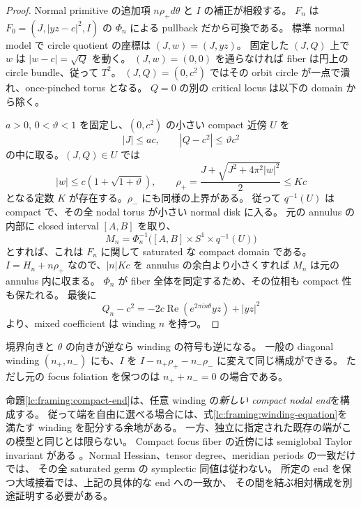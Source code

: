 \begin{proof}
Normal primitive の追加項 $n\rho_+d\theta$ と $I$ の補正が相殺する。
$F_n$ は $F_0=(J,|yz-c|^2,I)$ の $\Phi_n$ による pullback だから可換である。
標準 normal model で circle quotient の座標は $(J,w)=(J,yz)$。
固定した $(J,Q)$ 上で $w$ は $|w-c|=\sqrt Q$ を動く。
$(J,w)=(0,0)$ を通らなければ fiber は円上の circle bundle、従って $T^2$。
$(J,Q)=(0,c^2)$ ではその orbit circle が一点で潰れ、once-pinched torus となる。
$Q=0$ の別の critical locus は以下の domain から除く。

$a>0$, $0<\vartheta<1$ を固定し、$(0,c^2)$ の小さい compact 近傍 $U$ を
\[
 |J|\le ac,\qquad |Q-c^2|\le\vartheta c^2
\]
の中に取る。$(J,Q)\in U$ では
\[
 |w|\le c(1+\sqrt{1+\vartheta}),\qquad
 \rho_+=\frac{J+\sqrt{J^2+4\pi^2|w|^2}}2\le Kc
\]
となる定数 $K$ が存在する。$\rho_-$ にも同様の上界がある。
従って $q^{-1}(U)$ は compact で、その全 nodal torus が小さい normal disk に入る。
元の annulus の内部に closed interval $[A,B]$ を取り、
\[
 M_n=\Phi_n^{-1}\bigl([A,B]\times S^1\times q^{-1}(U)\bigr)
\]
とすれば、これは $F_n$ に関して saturated な compact domain である。
$I=H_n+n\rho_+$ なので、$|n|Kc$ を annulus の余白より小さくすれば $M_n$ は元の annulus 内に収まる。
$\Phi_n$ が fiber 全体を同定するため、その位相も compact 性も保たれる。
最後に
\[
 Q_n-c^2=-2c\operatorname{Re}(e^{2\pi in\theta}yz)+|yz|^2
\]
より、mixed coefficient は winding $n$ を持つ。
\end{proof}

境界向きと $\theta$ の向きが逆なら winding の符号も逆になる。
一般の diagonal winding $(n_+,n_-)$ にも、$I$ を
$I-n_+\rho_+-n_-\rho_-$ に変えて同じ構成ができる。
ただし元の focus foliation を保つのは $n_++n_-=0$ の場合である。

\begin{remark}[指定された端との一致は別の条件]\label{lc:framing:semiglobal}
命題\ref{lc:framing:compact-end}は、任意 winding の\emph{新しい compact nodal end}を構成する。
従って端を自由に選べる場合には、式\eqref{lc:framing:winding-equation}を満たす winding を配分する余地がある。
一方、独立に指定された既存の端がこの模型と同じとは限らない。
Compact focus fiber の近傍には semiglobal Taylor invariant がある
\cite{vungoc-local}。Normal Hessian、tensor degree、meridian periods の一致だけでは、
その全 saturated germ の symplectic 同値は従わない。
所定の end を保つ大域接着では、上記の具体的な end への一致か、
その間を結ぶ相対構成を別途証明する必要がある。
\end{remark}
